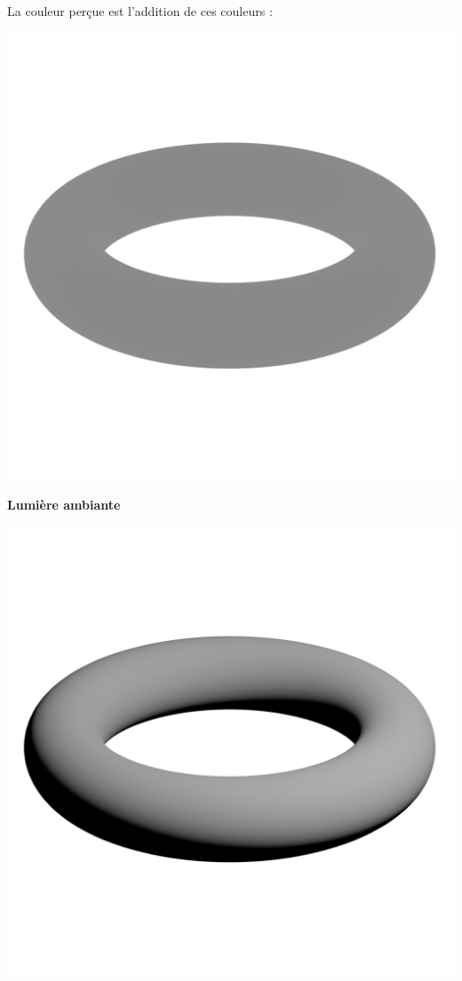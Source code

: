\documentclass[11pt,class=report,crop=false]{standalone}
\begin{document}
La couleur perçue est l'addition de ces couleurs :


\begin{center}
	\begin{minipage}{0.32\textwidth}
		\center
		\includegraphics[scale=\myscale,scale=0.13, trim={0 6cm 0 4cm}, clip]{figures/tore-ambiante}
		
		{\bf \quad Lumière ambiante}
	\end{minipage}
	\begin{minipage}{0.32\textwidth}
		\center
		\includegraphics[scale=\myscale,scale=0.13, trim={0 6cm 0 4cm}, clip]{figures/tore-diffuse}
		

\end{minipage}
\end{center}
\end{document}
